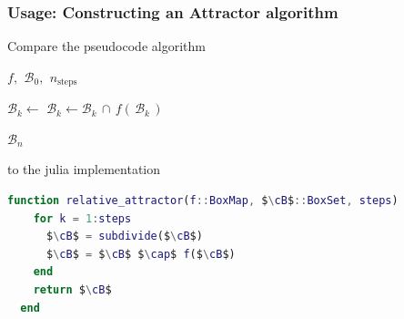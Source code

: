 \documentclass[
  english,            %
  aspectratio=169,    %
]{tumbeamer}
\newcommand{\cB}{\mathcal{B}}
\begin{document}
\begin{frame}[fragile]
\frametitle{Usage: Constructing an Attractor algorithm}


Compare the pseudocode algorithm

\begin{algorithmic}[1]
    \Require $f,\,\ \cB_0,\,\ n_{\text{steps}}$

        \State $\mathcal{B}_k \gets$ 
        \State $\mathcal{B}_k \gets \mathcal{B}_k\, \cap\, f (\,\mathcal{B}_k\,)$
    \EndFor

    \State \Return $\mathcal{B}_n$ 
\end{algorithmic}

to the julia implementation

\begin{lstlisting}[language=Matlab,mathescape]
  function relative_attractor(f::BoxMap, $\cB$::BoxSet, steps)
    for k = 1:steps
      $\cB$ = subdivide($\cB$)
      $\cB$ = $\cB$ $\cap$ f($\cB$)
    end
    return $\cB$
  end
\end{lstlisting}

\end{frame}
\end{document}
